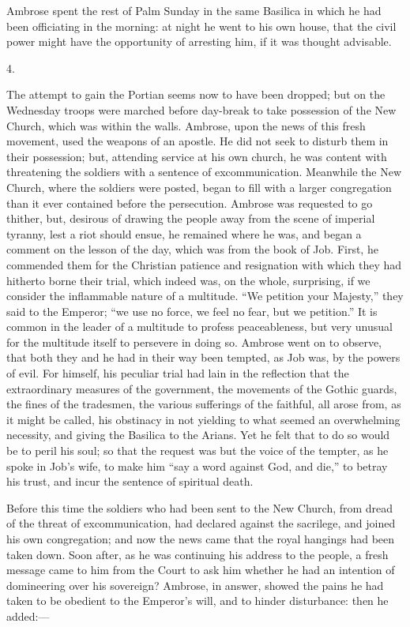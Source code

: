 Ambrose spent the rest of Palm Sunday in the same Basilica in which
he had been officiating in the morning: at night he went to his own
house, that the civil power might have the opportunity of arresting
him, if it was thought advisable.

4.

The attempt to gain the Portian seems now to have been dropped; but
on the Wednesday troops were marched before day-break to take
possession of the New Church, which was within the walls. Ambrose,
upon the news of this fresh movement, used the weapons of an apostle.
He did not seek to disturb them in their possession; but, attending
service at his own church, he was content with threatening the
soldiers with a sentence of excommunication. Meanwhile the New Church,
where the soldiers were posted, began to fill with a larger
congregation than it ever contained before the persecution. Ambrose
was requested to go thither, but, desirous of drawing the people away
from the scene of imperial tyranny, lest a riot should ensue, he
remained where he was, and began a comment on the lesson of the day,
which was from the book of Job. First, he commended them for the
Christian patience and resignation with which they had hitherto borne
their trial, which indeed was, on the whole, surprising, if we
consider the inflammable nature of a multitude. ``We petition your
Majesty,'' they said to the Emperor; ``we use no force, we
feel no fear, but we petition.'' It is common in the leader of a
multitude to profess peaceableness, but very unusual for the multitude
itself to persevere in doing so. Ambrose went on to observe, that both
they and he had in their way been tempted, as Job was, by the powers
of evil. For himself, his peculiar trial had lain in the reflection
that the extraordinary measures of the government, the movements of
the Gothic guards, the fines of the tradesmen, the various sufferings
of the faithful, all arose from, as it might be called, his obstinacy
in not yielding to what seemed an overwhelming necessity, and giving
the Basilica to the Arians. Yet he felt that to do so would be to
peril his soul; so that the request was but the voice of the tempter,
as he spoke in Job's wife, to make him ``say a word against God,
and die,'' to betray his trust, and incur the sentence of
spiritual death.

Before this time the soldiers who had been sent to the New Church,
from dread of the threat of excommunication, had declared against the
sacrilege, and joined his own congregation; and now the news came that
the royal hangings had been taken down. Soon after, as he was
continuing his address to the people, a fresh message came to him from
the Court to ask him whether he had an intention of domineering over
his sovereign? Ambrose, in answer, showed the pains he had taken to be
obedient to the Emperor's will, and to hinder disturbance: then he
added:—

